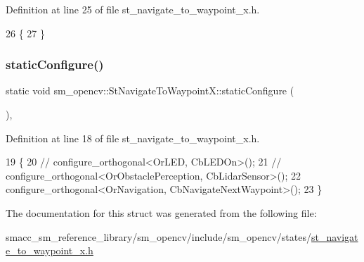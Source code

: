 Definition at line 25 of file st\+\_\+navigate\+\_\+to\+\_\+waypoint\+\_\+x.\+h.


\begin{DoxyCode}
26         \{
27         \}
\end{DoxyCode}
\mbox{\label{structsm__opencv_1_1StNavigateToWaypointX_a6a4b24a8fbf938df515162555247b246}} 
\subsubsection{\texorpdfstring{static\+Configure()}{staticConfigure()}}
{\footnotesize\ttfamily static void sm\+\_\+opencv\+::\+St\+Navigate\+To\+Waypoint\+X\+::static\+Configure (\begin{DoxyParamCaption}{ }\end{DoxyParamCaption})\hspace{0.3cm}{\ttfamily [inline]}, {\ttfamily [static]}}



Definition at line 18 of file st\+\_\+navigate\+\_\+to\+\_\+waypoint\+\_\+x.\+h.


\begin{DoxyCode}
19         \{
20             \textcolor{comment}{// configure\_orthogonal<OrLED, CbLEDOn>();}
21             \textcolor{comment}{// configure\_orthogonal<OrObstaclePerception, CbLidarSensor>();}
22             configure\_orthogonal<OrNavigation, CbNavigateNextWaypoint>();
23         \}
\end{DoxyCode}


The documentation for this struct was generated from the following file\+:\begin{DoxyCompactItemize}
\item 
smacc\+\_\+sm\+\_\+reference\+\_\+library/sm\+\_\+opencv/include/sm\+\_\+opencv/states/\hyperlink{include_2sm__opencv_2states_2st__navigate__to__waypoint__x_8h}{st\+\_\+navigate\+\_\+to\+\_\+waypoint\+\_\+x.\+h}\end{DoxyCompactItemize}
